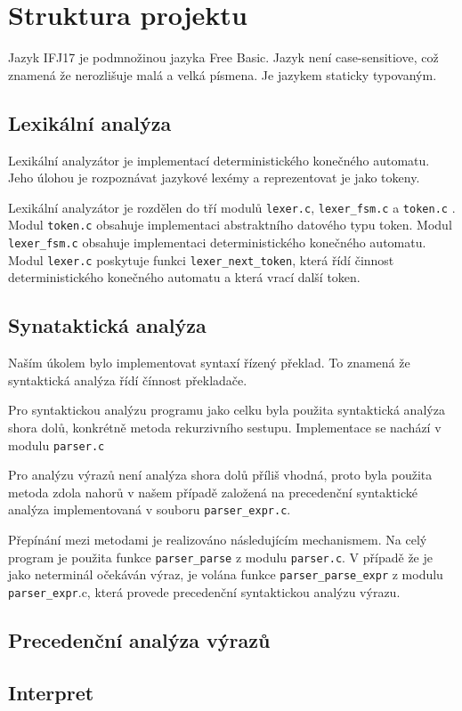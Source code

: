 \section{Struktura projektu}
Jazyk IFJ17 je podmnožinou jazyka Free Basic. Jazyk není case-sensitiove,
což znamená že nerozlišuje malá a velká písmena. Je jazykem staticky typovaným.
\subsection{Lexikální analýza}
Lexikální analyzátor je implementací deterministického konečného
automatu. Jeho úlohou je rozpoznávat jazykové lexémy a reprezentovat
je jako tokeny.

Lexikální analyzátor je rozdělen do tří modulů \texttt{lexer.c}, \texttt{lexer\_fsm.c} a \texttt{token.c}
. Modul \texttt{token.c} obsahuje implementaci abstraktního datového typu token. Modul \texttt{lexer\_fsm.c}
obsahuje implementaci deterministického konečného automatu. Modul \texttt{lexer.c} poskytuje funkci
\texttt{lexer\_next\_token}, která řídí činnost deterministického konečného automatu a
která vrací další token.

\subsection{Synataktická analýza}
Naším úkolem bylo implementovat syntaxí řízený překlad. To znamená
že syntaktická analýza řídí čínnost překladače.

Pro syntaktickou analýzu programu jako celku byla použita syntaktická
analýza shora dolů, konkrétně metoda rekurzivního sestupu. Implementace se nachází v modulu \texttt{parser.c}

Pro analýzu výrazů není analýza shora dolů příliš vhodná, proto byla
použita metoda zdola nahorů v našem případě založená na precedenční
syntaktické analýza implementovaná v souboru \texttt{parser\_expr.c}.

Přepínání mezi metodami je realizováno následujícím mechanismem. Na celý program je použita funkce \texttt{parser_parse}
z modulu \texttt{parser.c}. V případě že je jako neterminál očekáván výraz, je volána funkce \texttt{parser_parse_expr}
z modulu \texttt{parser\_expr}.c, která provede precedenční syntaktickou analýzu výrazu.

\subsection{Precedenční analýza výrazů}
\subsection{Interpret}
